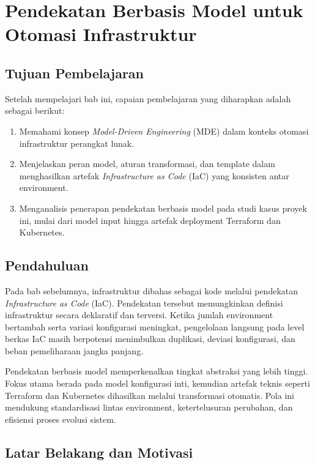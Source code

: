\chapter[Pendekatan Berbasis Model untuk Otomasi]{Pendekatan Berbasis Model untuk Otomasi Infrastruktur}\label{chap:mde-otomasi}

\section*{Tujuan Pembelajaran}

Setelah mempelajari bab ini, capaian pembelajaran yang diharapkan adalah sebagai berikut:

\begin{enumerate}
    \item Memahami konsep \textit{Model-Driven Engineering} (MDE) dalam konteks otomasi infrastruktur perangkat lunak.
    \item Menjelaskan peran model, aturan transformasi, dan template dalam menghasilkan artefak \textit{Infrastructure as Code} (IaC) yang konsisten antar environment.
    \item Menganalisis penerapan pendekatan berbasis model pada studi kasus proyek ini, mulai dari model input hingga artefak deployment Terraform dan Kubernetes.
\end{enumerate}

\section{Pendahuluan}\label{sec:mde-pendahuluan}

Pada bab sebelumnya, infrastruktur dibahas sebagai kode melalui pendekatan \textit{Infrastructure as Code} (IaC). Pendekatan tersebut memungkinkan definisi infrastruktur secara deklaratif dan terversi. Ketika jumlah environment bertambah serta variasi konfigurasi meningkat, pengelolaan langsung pada level berkas IaC masih berpotensi menimbulkan duplikasi, deviasi konfigurasi, dan beban pemeliharaan jangka panjang.

Pendekatan berbasis model memperkenalkan tingkat abstraksi yang lebih tinggi. Fokus utama berada pada model konfigurasi inti, kemudian artefak teknis seperti Terraform dan Kubernetes dihasilkan melalui transformasi otomatis. Pola ini mendukung standardisasi lintas environment, ketertelusuran perubahan, dan efisiensi proses evolusi sistem.

\section{Latar Belakang dan Motivasi}\label{sec:mde-latar-belakang}

